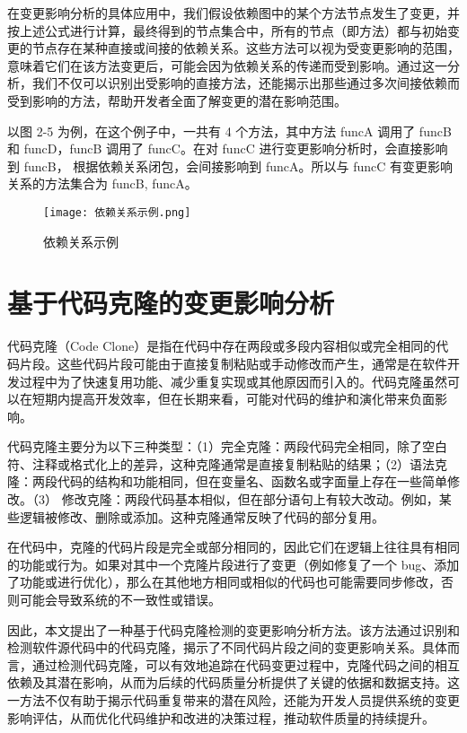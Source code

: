 在变更影响分析的具体应用中，我们假设依赖图中的某个方法节点发生了变更，并按上述公式进行计算，最终得到的节点集合中，所有的节点（即方法）都与初始变更的节点存在某种直接或间接的依赖关系。这些方法可以视为受变更影响的范围，意味着它们在该方法变更后，可能会因为依赖关系的传递而受到影响。通过这一分析，我们不仅可以识别出受影响的直接方法，还能揭示出那些通过多次间接依赖而受到影响的方法，帮助开发者全面了解变更的潜在影响范围。


以图 2-5 为例，在这个例子中，一共有 4 个方法，其中方法 funcA 调用了 funcB 和
funcD，funcB 调用了 funcC。在对 funcC 进行变更影响分析时，会直接影响到 funcB，
根据依赖关系闭包，会间接影响到 funcA。所以与 funcC 有变更影响关系的方法集合为
{funcB, funcA}。

\begin{figure}[h]
\centering
\texttt{[image: 依赖关系示例.png]}
\caption{依赖关系示例}
\end{figure}

\section{基于代码克隆的变更影响分析}
代码克隆（Code Clone）是指在代码中存在两段或多段内容相似或完全相同的代码片段。这些代码片段可能由于直接复制粘贴或手动修改而产生，通常是在软件开发过程中为了快速复用功能、减少重复实现或其他原因而引入的。代码克隆虽然可以在短期内提高开发效率，但在长期来看，可能对代码的维护和演化带来负面影响。

代码克隆主要分为以下三种类型：（1）完全克隆：两段代码完全相同，除了空白符、注释或格式化上的差异，这种克隆通常是直接复制粘贴的结果；（2）语法克隆：两段代码的结构和功能相同，但在变量名、函数名或字面量上存在一些简单修改。（3） 修改克隆：两段代码基本相似，但在部分语句上有较大改动。例如，某些逻辑被修改、删除或添加。这种克隆通常反映了代码的部分复用。


在代码中，克隆的代码片段是完全或部分相同的，因此它们在逻辑上往往具有相同的功能或行为。如果对其中一个克隆片段进行了变更（例如修复了一个 bug、添加了功能或进行优化），那么在其他地方相同或相似的代码也可能需要同步修改，否则可能会导致系统的不一致性或错误。

因此，本文提出了一种基于代码克隆检测的变更影响分析方法。该方法通过识别和检测软件源代码中的代码克隆，揭示了不同代码片段之间的变更影响关系。具体而言，通过检测代码克隆，可以有效地追踪在代码变更过程中，克隆代码之间的相互依赖及其潜在影响，从而为后续的代码质量分析提供了关键的依据和数据支持。这一方法不仅有助于揭示代码重复带来的潜在风险，还能为开发人员提供系统的变更影响评估，从而优化代码维护和改进的决策过程，推动软件质量的持续提升。

